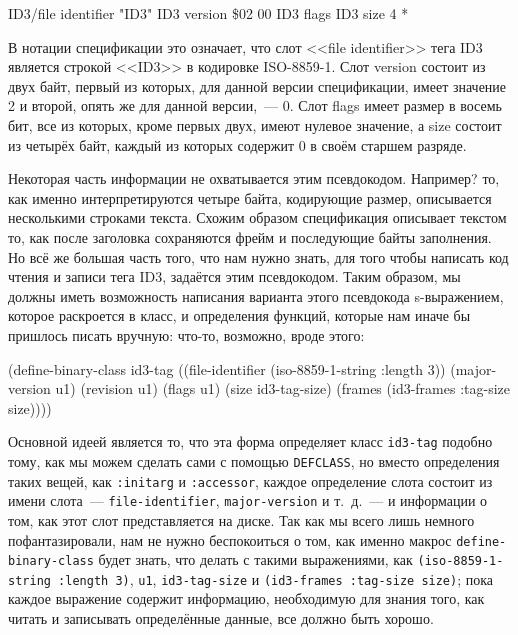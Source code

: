 \begin{myverb}
ID3/file identifier      "ID3"
ID3 version              \$02 00
ID3 flags                %
ID3 size             4 * %
\end{myverb}

В нотации спецификации это означает, что слот <<file identifier>> тега ID3 является строкой
<<ID3>> в кодировке ISO-8859-1. Слот version состоит из двух байт, первый из которых, для
данной версии спецификации, имеет значение 2 и второй, опять же для данной версии,~---
0. Слот flags имеет размер в восемь бит, все из которых, кроме первых двух, имеют нулевое
значение, а size состоит из четырёх байт, каждый из которых содержит 0 в своём старшем
разряде.

Некоторая часть информации не охватывается этим псевдокодом. Например? то, как именно
интерпретируются четыре байта, кодирующие размер, описывается несколькими строками
текста. Схожим образом спецификация описывает текстом то, как после заголовка сохраняются
фрейм и последующие байты заполнения. Но всё же большая часть того, что нам нужно знать,
для того чтобы написать код чтения и записи тега ID3, задаётся этим псевдокодом. Таким
образом, мы должны иметь возможность напи\-сания варианта этого псевдокода s-выражением,
которое раскроется в класс, и определения функций, которые нам иначе бы пришлось писать
вручную: что-то, возможно, вроде этого:

\begin{myverb}
(define-binary-class id3-tag
  ((file-identifier (iso-8859-1-string :length 3))
   (major-version   u1)
   (revision        u1)
   (flags           u1)
   (size            id3-tag-size)
   (frames          (id3-frames :tag-size size))))
\end{myverb}

Основной идеей является то, что эта форма определяет класс \lstinline{id3-tag} подобно тому,
как мы можем сделать сами с помощью \lstinline{DEFCLASS}, но вместо определения таких вещей,
как \lstinline{:initarg} и \lstinline{:accessor}, каждое определение слота состоит из имени
слота~--- \lstinline{file-identifier}, \lstinline{major-version} и т.~д.~--- и информации о том, как
этот слот представляется на диске. Так как мы всего лишь немного пофантазировали, нам не
нужно беспокоиться о том, как именно макрос \lstinline{define-binary-class} будет знать, что
делать с такими выражениями, как \lstinline{(iso-8859-1-string :length 3)}, \lstinline{u1},
\lstinline{id3-tag-size} и \lstinline{(id3-frames :tag-size size)}; пока каждое выражение содержит
информацию, необходимую для знания того, как читать и записывать определённые данные, все
должно быть хорошо.

